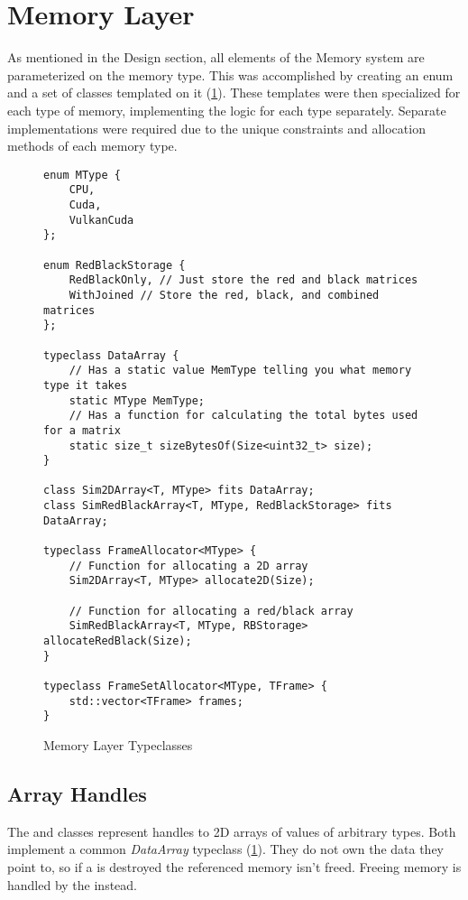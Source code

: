 \section{Memory Layer}
As mentioned in the Design section, all elements of the Memory system are parameterized on the memory type.
This was accomplished by creating an enum  and a set of classes templated on it (\cref{fig:TypeclassMemory}).
These templates were then specialized for each type of memory, implementing the logic for each type separately.
Separate implementations were required due to the unique constraints and allocation methods of each memory type.

\begin{figure}[hb]
    \centering
\begin{verbatim}
enum MType {
    CPU,
    Cuda,
    VulkanCuda
};

enum RedBlackStorage {
    RedBlackOnly, // Just store the red and black matrices
    WithJoined // Store the red, black, and combined matrices
};

typeclass DataArray {
    // Has a static value MemType telling you what memory type it takes
    static MType MemType;
    // Has a function for calculating the total bytes used for a matrix
    static size_t sizeBytesOf(Size<uint32_t> size);
}

class Sim2DArray<T, MType> fits DataArray;
class SimRedBlackArray<T, MType, RedBlackStorage> fits DataArray;

typeclass FrameAllocator<MType> {
    // Function for allocating a 2D array
    Sim2DArray<T, MType> allocate2D(Size);
    
    // Function for allocating a red/black array
    SimRedBlackArray<T, MType, RBStorage> allocateRedBlack(Size);
}

typeclass FrameSetAllocator<MType, TFrame> {
    std::vector<TFrame> frames;
}
\end{verbatim}
    \caption{Memory Layer Typeclasses}
    \label{fig:TypeclassMemory}
\end{figure}

\subsection{Array Handles}
The  and  classes represent handles to 2D arrays of values of arbitrary types.
Both implement a common \emph{DataArray} typeclass (\cref{fig:TypeclassMemory}).
They do not own the data they point to, so if a  is destroyed the referenced memory isn't freed.
Freeing memory is handled by the  instead.

